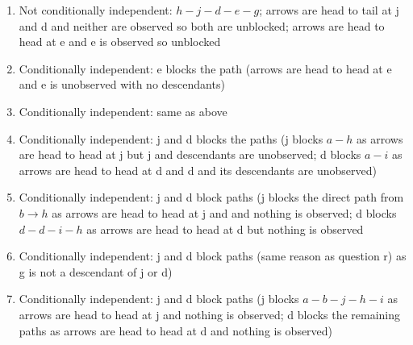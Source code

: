 \documentclass[12pt,twoside]{article}
\begin{document}
\begin{enumerate}[label=\alph*)]
    \item Not conditionally independent: $h - j - d - e - g$; arrows are head to tail at j and d and neither are observed so both are unblocked; arrows are head to head at e and e is observed so unblocked
    \item Conditionally independent: e blocks the path (arrows are head to head at e and e is unobserved with no descendants)
    \item Conditionally independent: same as above
    \item Conditionally independent: j and d blocks the paths (j blocks $a - h$ as arrows are head to head at j but j and descendants are unobserved; d blocks $a - i$ as arrows are head to head at d and d and its descendants are unobserved)
    \item Conditionally independent: j and d block paths (j blocks the direct path from $b \rightarrow h$ as arrows are head to head at j and and nothing is observed; d blocks $d - d - i - h$ as arrows are head to head at d but nothing is observed
    \item Conditionally independent: j and d block paths (same reason as question r) as g is not a descendant of j or d)
    \item Conditionally independent: j and d block paths (j blocks $a - b - j - h - i$ as arrows are head to head at j and nothing is observed; d blocks the remaining paths as arrows are head to head at d and nothing is observed)
\end{enumerate}
\end{document}
